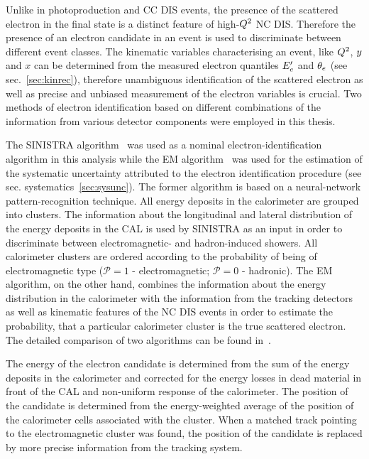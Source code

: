 Unlike in photoproduction and CC DIS events, the presence of the scattered electron in the final state is a distinct feature of high-$\mbox{${Q^2}$}$ NC DIS. Therefore the presence of an electron candidate in an event is used to discriminate between different event classes. The kinematic variables characterising an event, like $\mbox{${Q^2}$}$, $\mbox{${y}$}$ and $x$ can be determined from the measured electron quantiles $\mbox{$E_e'$}$ and $\mbox{$\theta_e$}$ (see sec.~\ref{sec:kinrec}), therefore unambiguous identification of the scattered electron as well as precise and unbiased measurement of the electron variables is crucial. Two methods of electron identification based on different combinations of the information from various detector components were employed in this thesis. 

The SINISTRA algorithm~\cite{nim:a365:508} was used as a nominal electron-identification algorithm in this analysis while the EM algorithm~\cite{epj:c11:427,upub:Straub:url} was used for the estimation of the systematic uncertainty attributed to the electron identification procedure (see sec. systematics~\ref{sec:sysunc}). The former algorithm is based on a neural-network pattern-recognition technique. All energy deposits in the calorimeter are grouped into clusters. The information about the longitudinal and lateral distribution of the energy deposits in the CAL is used by SINISTRA as an input in order to discriminate between electromagnetic- and hadron-induced showers. All calorimeter clusters are ordered according to the probability of being of electromagnetic type (${\mathcal P}=1$ - electromagnetic; ${\mathcal P=0}$ - hadronic). The EM algorithm, on the other hand, combines the information about the energy distribution in the calorimeter with the information from the tracking detectors as well as kinematic features of the NC DIS events in order to estimate the probability, that a particular calorimeter cluster is the true scattered electron. The detailed comparison of two algorithms can be found in~\cite{upub:schlenstedt:zn9977}.

The energy of the electron candidate is determined from the sum of the energy deposits in the calorimeter and corrected for the energy losses in dead material in front of the CAL and non-uniform response of the calorimeter. The position of the candidate is determined from the energy-weighted average of the position of the calorimeter cells associated with the cluster. When a matched track pointing to the electromagnetic cluster was found, the position of the candidate is replaced by more precise information from the tracking system.